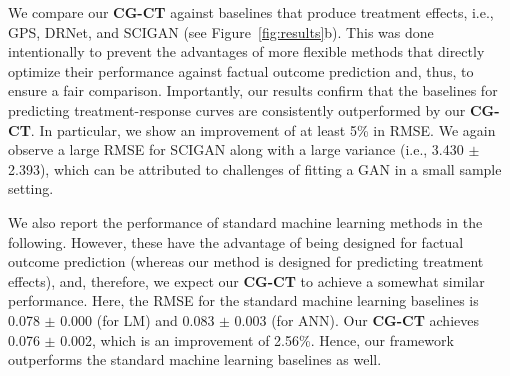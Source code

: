 \documentclass[sigconf]{acmart}
\newcommand{\framework}{\textbf{\mbox{CG-CT}}\xspace}
\begin{document}
We compare our \framework against baselines that produce treatment effects, i.e., GPS, DRNet, and SCIGAN  (see Figure~\ref{fig:results}b). This was done intentionally to prevent the advantages of more flexible methods that directly optimize their performance against factual outcome prediction and, thus, to ensure a fair comparison. Importantly, our results confirm that the baselines for predicting treatment-response curves are consistently outperformed by our \framework. In particular, we show an improvement of at least 5\% in RMSE. We again observe a large RMSE for SCIGAN along with a large variance (i.e., 3.430 $\pm$ 2.393), which can be attributed to challenges of fitting a GAN in a small sample setting. 

We also report the performance of standard machine learning methods in the following. However, these have the advantage of being designed for factual outcome prediction (whereas our method is designed for predicting treatment effects), and, therefore, we expect our \framework to achieve a somewhat similar performance. Here, the RMSE for the standard machine learning baselines is 0.078 $\pm$ 0.000 (for LM) and 0.083 $\pm$ 0.003 (for ANN). Our \framework achieves 0.076 $\pm$ 0.002, which is an improvement of 2.56\%. Hence, our framework outperforms the standard machine learning baselines as well. 


\end{document}
